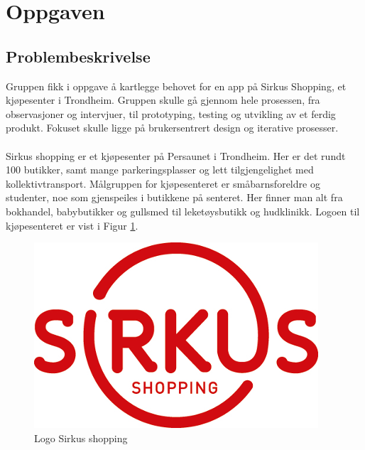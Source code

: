 \section{\textcolor[HTML]{D32F2F}{Oppgaven}}

\subsection{Problembeskrivelse}
Gruppen fikk i oppgave å kartlegge behovet for en app på Sirkus Shopping, et kjøpesenter i Trondheim. Gruppen skulle gå gjennom hele prosessen, fra observasjoner og intervjuer, til prototyping, testing og utvikling av et ferdig produkt. Fokuset skulle ligge på brukersentrert design og iterative prosesser. 
\\\\
Sirkus shopping er et kjøpesenter på Persaunet i Trondheim. Her er det rundt 100 butikker, samt mange parkeringsplasser og lett tilgjengelighet med kollektivtransport. Målgruppen for kjøpesenteret er småbarnsforeldre og studenter, noe som gjenspeiles i butikkene på senteret.  Her finner man alt fra bokhandel, babybutikker og gullsmed til leketøysbutikk og hudklinikk\cite{sirkus}. Logoen til kjøpesenteret er vist i Figur \ref{fig:sirkus}.

\begin{figure}[H]
\includegraphics[scale=0.6]{images/sirkus}
\centering %
\caption{Logo Sirkus shopping}
\label{fig:sirkus}
\end{figure}

